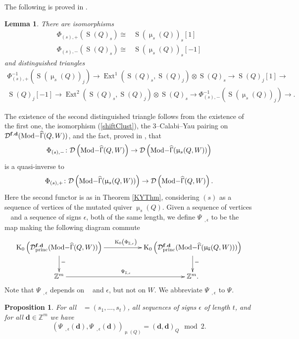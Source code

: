 \documentclass[a4paper,10pt]{amsart}
\newtheorem{proposition}[theorem]{Proposition}
\newtheorem{lemma}[theorem]{Lemma}
\newcommand{\dd}{\mathbf{d}}
\DeclareMathOperator{\Simp}{S}
\renewcommand{\Gamma}{\Upgamma}
\renewcommand{\mu}{\upmu}
\DeclareMathOperator{\KK}{K_0}
\DeclareMathOperator{\Ext}{Ext}
\DeclareMathOperator{\fd}{\mathbf{f.d}}
\DeclareMathOperator{\Tmod}{Mod-}
\newcommand{\Rmod}[1]{\Tmod\!#1}
\DeclareMathOperator{\HGamma}{\widehat{\Gamma}}
\DeclareMathOperator{\princ}{princ}
\DeclareMathOperator{\Ss}{\overline{s}}
\newcommand{\Dub}{\mathcal{D}}
\begin{document}
The following is proved in \cite[Lem.3.11]{KellerMutations}.
\begin{lemma}
\label{simpTransf}
There are isomorphisms
\begin{align}
\Phi_{(s),+}(\Simp(Q)_{s})\cong &\Simp(\mu_s(Q))_s[1]\nonumber \\
\Phi_{(s),-}(\Simp(Q)_{s})\cong &\Simp(\mu_s(Q))_s[-1]\label{shiftClust}
\end{align}
and distinguished triangles 
\begin{align}
\Phi_{(s),+}^{-1}\left(\Simp(\mu_s(Q))_j\right)\rightarrow \Ext^1\left(\Simp(Q)_s,\Simp(Q)_j\right)\otimes \Simp(Q)_s\rightarrow \Simp(Q)_j[1]\rightarrow \label{simpEx}\\
\Simp(Q)_j[-1]\rightarrow \Ext^2\left(\Simp(Q)_s,\Simp(Q)_j\right)\otimes \Simp(Q)_s\rightarrow \Phi_{(s),-}^{-1}\left(\Simp(\mu_s(Q))_j\right)\rightarrow.\label{readback}
\end{align}
\end{lemma}
The existence of the second distinguished triangle follows from the existence of the first one, the isomorphism (\ref{shiftClust}), the 3--Calabi--Yau pairing on $\Dub^{\fd}(\Rmod{\HGamma(Q,W)})$, and the fact, proved in \cite[Lem.3.11]{KellerMutations}, that 
\[
\Phi_{(s),-}\colon \Dub\left(\Rmod{\HGamma(Q,W)}\right)\rightarrow\Dub\left(\Rmod{\HGamma(\mu_{s}(Q,W))}\right)
\]
is a quasi-inverse to 
\[
\Phi_{(s),+}\colon \Dub\left(\Rmod{\HGamma(\mu_s(Q,W))}\right)\rightarrow \Dub\left(\Rmod{\HGamma(Q,W)}\right).
\]
Here the second functor is as in Theorem \ref{KYThm}, considering $(s)$ as a sequence of vertices of the mutated quiver $\mu_s(Q)$.  Given a sequence of vertices $\Ss$ and a sequence of signs $\epsilon$, both of the same length, we define $\Psi_{\Ss,\epsilon}$ to  be the map making the following diagram commute
\[
\xymatrix{
\KK\left(\Dub^{\fd}_{\princ}(\Rmod{\HGamma(Q,W)})\right)\ar[d]^=\ar[rr]^{\KK\left(\Phi_{\Ss,\epsilon}\right)}&&\KK\left(\Dub^{\fd}_{\princ}(\Rmod{\HGamma(\mu_{\Ss}(Q,W))})\right)\ar[d]^=\\
\mathbb{Z}^m\ar[rr]^{\Psi_{\Ss,\epsilon}}&&\mathbb{Z}^m.
}
\]
Note that $\Psi_{\Ss,\epsilon}$ depends on $\Ss$ and $\epsilon$, but not on $W$.  We abbreviate $\Psi_{\Ss,\epsilon_{\Ss}}$ to $\Psi_{\Ss}$.
\begin{proposition}
\label{invOD}
For all $\Ss=(s_1,\ldots,s_t)$, all sequences of signs $\epsilon$ of length $t$, and for all $\dd\in\mathbb{Z}^m$ we have 
\[
(\Psi_{\Ss,\epsilon}(\dd),\Psi_{\Ss,\epsilon}(\dd))_{\mu_{\Ss}(Q)}=(\dd,\dd)_Q\mod 2.
\]
\end{proposition}
\end{document}
